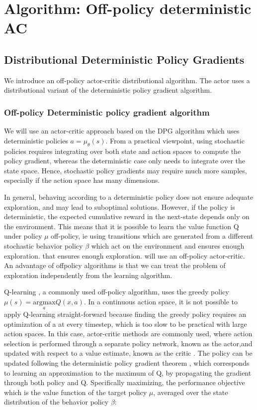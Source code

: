 \chapter{Algorithm: Off-policy deterministic AC}
\label{sec:algo}
\section{Distributional Deterministic Policy Gradients}

We introduce an off-policy actor-critic distributional algorithm.
The actor uses a distributional variant of the deterministic policy gradient algorithm.

\subsection{Off-policy Deterministic policy gradient algorithm}
We will use an actor-critic approach based on the DPG algorithm \cite{silver2014b}
which uses deterministic policies $a=\mu_{\theta}(s)$.
From a practical viewpoint, using stochastic policies requires integrating over both
state and action spaces to compute the policy gradient, whereas the deterministic case
only needs to integrate over the state space. Hence, stochastic policy gradients
may require much more samples, especially if the action space has many dimensions.

In general, behaving according to a deterministic policy does not ensure adequate exploration,
and may lead to suboptimal solutions. 
However, if the policy is deterministic, the expected cumulative reward in the next-state
depends only on the environment. This means that it is possible to learn the value function
Q under policy $\mu$ off-policy, ie using transitions which are generated from a different stochastic
behavior policy $\beta$ which act on the environment and ensures enough exploration.
that ensures enough exploration. will use an off-policy actor-critic.
An advantage of offpolicy algorithms is that we can treat the problem of exploration
independently from the learning algorithm.

Q-learning \cite{Watkins1992}, a commonly used off-policy algorithm, uses the greedy policy
$\mu(s)=\underset{a}{\text{argmax}} Q(x,a)$.
In  a  continuous  action  space, it is not possible to apply Q-learning straight-forward because finding the 
greedy policy requires an optimization of a at every timestep, which is too slow to be practical with large action spaces.
In this case, actor-critic methods are commonly used, where action selection is performed through a
separate policy network, known as the actor,and updated with respect to a value estimate,
known as the critic \cite{Sutton1998}.
The policy can be updated following the deterministic policy gradient theorem \cite{silver2014b},
which corresponds to learning an approximation to the maximum of Q,
by propagating the gradient through both policy and Q.
Specifically maximizing, the performance objective which is the value function of the target policy $\mu$, averaged over the state
distribution of the behavior policy $\beta$:

